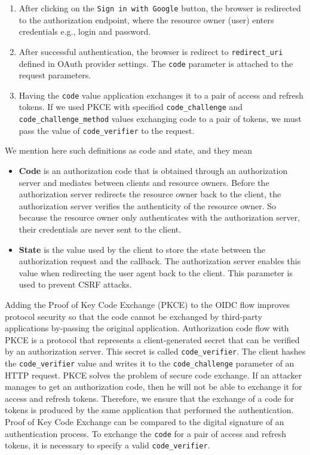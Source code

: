 \begin{enumerate}
    \item After clicking on the \texttt{Sign in with Google} button,
    the browser is redirected to the authorization endpoint, where the resource owner (user) enters credentials e.g., login and password.
    \item After successful authentication, the browser is redirect to \texttt{redirect\_uri} defined in OAuth provider settings.
    The \texttt{code} parameter is attached to the request parameters.
    \item Having the \texttt{code} value application exchanges it to a pair of access and refresh tokens.
    If we used PKCE with specified \texttt{code\_challenge} and \texttt{code\_challenge\_method} values exchanging code to a pair of tokens,
    we must pass the value of \texttt{code\_verifier} to the request.
\end{enumerate}
We mention here such definitions as code and state, and they mean
\begin{itemize}
    \item \textbf{Code} is an authorization code that is obtained through an authorization
    server and mediates between clients and resource owners.
    Before the authorization server redirects the resource owner back to the client,
    the authorization server verifies the authenticity of the resource owner.
    So because the resource owner only authenticates with the authorization server,
    their credentials are never sent to the client.
    \item \textbf{State} is the value used by the client to store the state between the authorization request and the callback.
    The authorization server enables this value when redirecting the user agent back to the client.
    This parameter is used to prevent CSRF attacks.
\end{itemize}

Adding the Proof of Key Code Exchange (PKCE) to the OIDC flow improves protocol security so that the code
cannot be exchanged by third-party applications by-passing the original application.
Authorization code flow with PKCE is a protocol that represents a client-generated secret that can be verified
by an authorization server.
This secret is called \texttt{code\_verifier}.
The client hashes the \texttt{code\_verifier} value and writes it to the \texttt{code\_challenge} parameter
of an HTTP request.
PKCE solves the problem of secure code exchange.
If an attacker manages to get an authorization code, then he will not be able to exchange
it for access and refresh tokens.
Therefore, we ensure that the exchange of a code for tokens is produced by the same application
that performed the authentication.
Proof of Key Code Exchange can be compared to the digital signature of an authentication process.
To exchange the \texttt{code} for a pair of access and refresh tokens, it is necessary to specify
a valid \texttt{code\_verifier}.